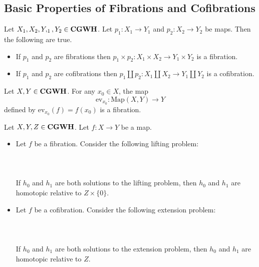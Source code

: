 \documentclass[a4paper]{article}
\begin{document}
\subsection{Basic Properties of Fibrations and Cofibrations}
\begin{prp}{}{} Let $X_1,X_2,Y,_1,Y_2\in\bold{CGWH}$. Let $p_1:X_1\to Y_1$ and $p_2:X_2\to Y_2$ be maps. Then the following are true. 
\begin{itemize}
\item If $p_1$ and $p_2$ are fibrations then $p_1\times p_2:X_1\times X_2\to Y_1\times Y_2$ is a fibration. 
\item If $p_1$ and $p_2$ are cofibrations then $p_1\coprod p_2:X_1\coprod X_2\to Y_1\coprod Y_2$ is a cofibration. 
\end{itemize}
\end{prp}

\begin{prp}{}{} Let $X,Y\in\bold{CGWH}$. For any $x_0\in X$, the map $$\text{ev}_{x_0}:\text{Map}(X,Y)\to Y$$ defined by $\text{ev}_{x_0}(f)=f(x_0)$ is a fibration. 
\end{prp}

\begin{prp}{}{} Let $X,Y,Z\in\bold{CGWH}$. Let $f:X\to Y$ be a map. 
\begin{itemize}
\item Let $f$ be a fibration. Consider the following lifting problem: \\~\\
\\~\\
If $h_0$ and $h_1$ are both solutions to the lifting problem, then $h_0$ and $h_1$ are homotopic relative to $Z\times\{0\}$. 
\item Let $f$ be a cofibration. Consider the following extension problem: \\~\\
\\~\\
If $h_0$ and $h_1$ are both solutions to the extension problem, then $h_0$ and $h_1$ are homotopic relative to $Z$. 
\end{itemize}
\end{prp}
\end{document}
